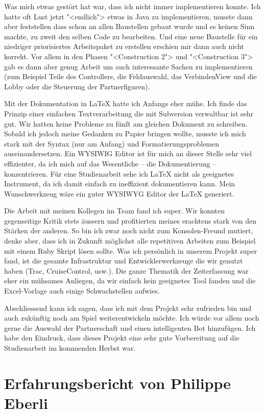 \documentclass[12pt,halfparskip]{scrartcl}
\begin{document}
Was mich etwas gestört hat war, dass ich nicht immer implementieren konnte. Ich hatte oft Lust jetzt "<endlich"> etwas in Java zu implementieren, musste dann aber feststellen dass schon an allen Baustellen gebaut wurde und es keinen Sinn machte, zu zweit den selben Code zu bearbeiten. Und eine neue Baustelle für ein niedriger priorisiertes Arbeitspaket zu erstellen erschien mir dann auch nicht korrekt. Vor allem in den Phasen "<Construction 2"> und "<Construction 3"> gab es dann aber genug Arbeit um auch interessante Sachen zu implementieren (zum Beispiel Teile des Controllers, die Feldauswahl, das VerbindenView und die Lobby oder die Steuerung der Partnerfiguren).

Mit der Dokumentation in LaTeX hatte ich Anfangs eher mühe. Ich finde das Prinzip einer einfachen Textverarbeitung die mit Subversion verwaltbar ist sehr gut. Wir hatten keine Probleme zu fünft am gleichen Dokument zu schreiben. Sobald ich jedoch meine Gedanken zu Papier bringen wollte, musste ich mich stark mit der Syntax (nur am Anfang) und Formatierungsproblemen auseinandersetzen. Ein WYSIWIG Editor ist für mich an dieser Stelle sehr viel effizienter, da ich mich auf das Wesentliche -- die Dokumentierung -- konzentrieren. Für eine Studienarbeit sehe ich LaTeX nicht als geeignetes Instrument, da ich damit einfach zu ineffizient dokumentieren kann. Mein Wunschwerkzeug wäre ein guter WYSIWYG Editor der LaTeX generiert.

Die Arbeit mit meinen Kollegen im Team fand ich super. Wir konnten gegenseitige Kritik stets äussern und profitierten meines erachtens stark von den Stärken der anderen. So bin ich zwar noch nicht zum Konsolen-Freund mutiert, denke aber, dass ich in Zukunft möglichst alle repetitiven Arbeiten zum Beispiel mit einem Ruby Skript lösen sollte. Was ich persönlich in unserem Projekt super fand, ist die gesamte Infrastruktur und Entwicklerwerkzeuge die wir genutzt haben (Trac, CruiseControl, usw.). Die ganze Thematik der Zeiterfassung war eher ein mühsames Anliegen, da wir einfach kein geeignetes Tool fanden und die Excel-Vorlage auch einige Schwachstellen aufwies.
			
Abschliessend kann ich sagen, dass ich mit dem Projekt sehr zufrieden bin und auch zukünftig noch am Spiel weiterentwickeln möchte. Ich würde vor allem noch gerne die Auswahl der Partnerschaft und einen intelligenten Bot hinzufügen. Ich habe den Eindruck, dass dieses Projekt eine sehr gute Vorbereitung auf die Studienarbeit im kommenden Herbst war.

\section{Erfahrungsbericht von Philippe Eberli}
\end{document}
